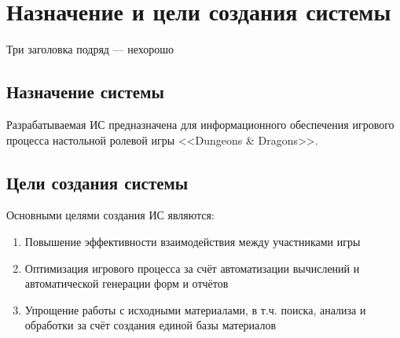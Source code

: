 \section{Назначение и цели создания системы}

Три заголовка подряд --- нехорошо

\subsection{Назначение системы}
Разрабатываемая ИС предназначена для информационного обеспечения игрового процесса настольной ролевой игры <<Dungeons \& Dragons>>.

\subsection{Цели создания системы}
Основными целями создания ИС являются:
\begin{enumerate}
\item Повышение эффективности взаимодействия между участниками игры
\item Оптимизация игрового процесса за счёт автоматизации вычислений и автоматической генерации форм и отчётов
\item Упрощение работы с исходными материалами, в т.ч. поиска, анализа и обработки за счёт создания единой базы материалов
\end{enumerate}
